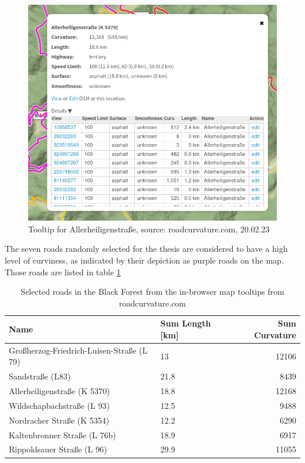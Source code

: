 \begin{figure}[h]
    \centering
    \includegraphics[width=0.8\linewidth]{images/tooltip.png}
    \caption{Tooltip for Allerheiligenstraße, source: roadcurvature.com, 20.02.23}
    \label{fig:tooltip}
\end{figure}

The seven roads randomly selected for the thesis are considered to have a high level of curviness, as indicated by their depiction as purple roads on the map. Those roads are listed in table \ref{tab:roadsample}

    \begin{table}[htb]
    \centering
    \begin{tabular}{@{}llr@{}} \toprule
        Name                                      & Sum Length [km] & Sum Curvature \\ \midrule
        Großherzog-Friedrich-Luisen-Straße (L 79) & 13              & 12106         \\
        Sandstraße (L83)                          & 21.8            & 8439          \\
        Allerheiligenstraße (K 5370)              & 18.8            & 12168         \\
        Wildschapbachstraße (L 93)                & 12.5            & 9488          \\
        Nordracher Straße (K 5354)                & 12.2            & 6290          \\
        Kaltenbronner Straße (L 76b)              & 18.9            & 6917          \\
        Rippoldsauer Straße (L 96)              & 29.9              & 11055         \\\bottomrule
    \end{tabular}
    \caption{Selected roads in the Black Forest from the in-browser map tooltips from roadcurvature.com} 
    \label{tab:roadsample}
    \end{table}


